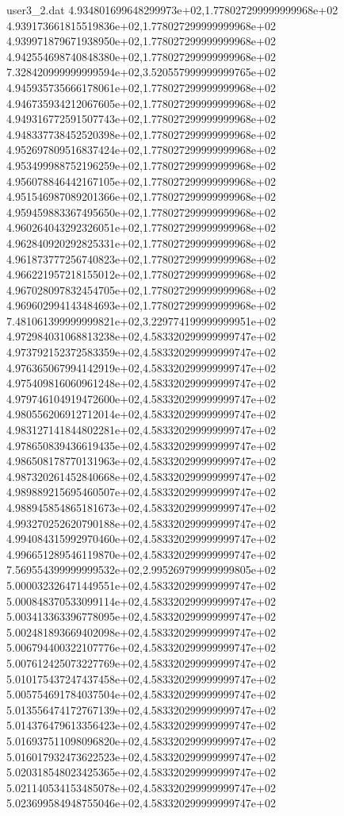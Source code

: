 \begin{filecontents}{user3_2.dat}
4.934801699648299973e+02,1.778027299999999968e+02
4.939173661815519836e+02,1.778027299999999968e+02
4.939971879671938950e+02,1.778027299999999968e+02
4.942554698740848380e+02,1.778027299999999968e+02
7.328420999999999594e+02,3.520557999999999765e+02
4.945935735666178061e+02,1.778027299999999968e+02
4.946735934212067605e+02,1.778027299999999968e+02
4.949316772591507743e+02,1.778027299999999968e+02
4.948337738452520398e+02,1.778027299999999968e+02
4.952697809516837424e+02,1.778027299999999968e+02
4.953499988752196259e+02,1.778027299999999968e+02
4.956078846442167105e+02,1.778027299999999968e+02
4.951546987089201366e+02,1.778027299999999968e+02
4.959459883367495650e+02,1.778027299999999968e+02
4.960264043292326051e+02,1.778027299999999968e+02
4.962840920292825331e+02,1.778027299999999968e+02
4.961873777256740823e+02,1.778027299999999968e+02
4.966221957218155012e+02,1.778027299999999968e+02
4.967028097832454705e+02,1.778027299999999968e+02
4.969602994143484693e+02,1.778027299999999968e+02
7.481061399999999821e+02,3.229774199999999951e+02
4.972984031068813238e+02,4.583320299999999747e+02
4.973792152372583359e+02,4.583320299999999747e+02
4.976365067994142919e+02,4.583320299999999747e+02
4.975409816060961248e+02,4.583320299999999747e+02
4.979746104919472600e+02,4.583320299999999747e+02
4.980556206912712014e+02,4.583320299999999747e+02
4.983127141844802281e+02,4.583320299999999747e+02
4.978650839436619435e+02,4.583320299999999747e+02
4.986508178770131963e+02,4.583320299999999747e+02
4.987320261452840668e+02,4.583320299999999747e+02
4.989889215695460507e+02,4.583320299999999747e+02
4.988945854865181673e+02,4.583320299999999747e+02
4.993270252620790188e+02,4.583320299999999747e+02
4.994084315992970460e+02,4.583320299999999747e+02
4.996651289546119870e+02,4.583320299999999747e+02
7.569554399999999532e+02,2.995269799999999805e+02
5.000032326471449551e+02,4.583320299999999747e+02
5.000848370533099114e+02,4.583320299999999747e+02
5.003413363396778095e+02,4.583320299999999747e+02
5.002481893669402098e+02,4.583320299999999747e+02
5.006794400322107776e+02,4.583320299999999747e+02
5.007612425073227769e+02,4.583320299999999747e+02
5.010175437247437458e+02,4.583320299999999747e+02
5.005754691784037504e+02,4.583320299999999747e+02
5.013556474172767139e+02,4.583320299999999747e+02
5.014376479613356423e+02,4.583320299999999747e+02
5.016937511098096820e+02,4.583320299999999747e+02
5.016017932473622523e+02,4.583320299999999747e+02
5.020318548023425365e+02,4.583320299999999747e+02
5.021140534153485078e+02,4.583320299999999747e+02
5.023699584948755046e+02,4.583320299999999747e+02

\end{filecontents}
